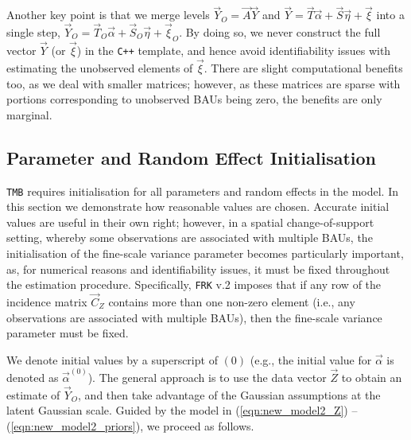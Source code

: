 \documentclass[12pt,a4paper]{article}
\begin{document}
\begin{appendices}
Another key point is that we merge levels $\vec{Y}_O = \vec{A}\vec{Y}$ and $\vec{Y} = \vec{T} \vec{\alpha} + \vec{S} \vec{\eta} + \vec{\xi}$ into a single step, $\vec{Y}_O = \vec{T}_O \vec{\alpha} + \vec{S}_O \vec{\eta} + \vec{\xi}_O$. 
By doing so, we never construct the full vector $\vec{Y}$ (or $\vec{\xi}$) in the \texttt{C++} template, and hence avoid identifiability issues with estimating the unobserved elements of $\vec{\xi}$. 
There are slight computational benefits too, as we deal with smaller matrices; however, as these matrices are sparse with portions corresponding to unobserved BAUs being zero, the benefits are only marginal.



\subsection{Parameter and Random Effect Initialisation}\label{subsection:04-04:Initialisations}


\texttt{TMB} requires initialisation for all parameters and random effects in the model. 
In this section we demonstrate how reasonable values are chosen. 
Accurate initial values are useful in their own right; however, in a spatial change-of-support setting, whereby some observations are associated with multiple BAUs, the initialisation of the fine-scale variance parameter becomes particularly important, as, for numerical reasons and identifiability issues, it must be fixed throughout the estimation procedure. 
Specifically, \texttt{FRK} v.2 imposes that if any row of the incidence matrix $\vec{C}_Z$ contains more than one non-zero element (i.e., any observations are associated with multiple BAUs), then the fine-scale variance parameter must be fixed. 

We denote initial values by a superscript of $(0)$ (e.g., the initial value for $\vec{\alpha}$ is denoted as $\vec{\alpha}^{(0)}$).
The general approach is to use the data vector $\vec{Z}$ to obtain an estimate of $\vec{Y}_O$, and then take advantage of the Gaussian assumptions at the latent Gaussian scale. 
Guided by the model in (\ref{eqn:new_model2_Z}) -- (\ref{eqn:new_model2_priors}), we proceed as follows. 


\end{appendices}
\end{document}
